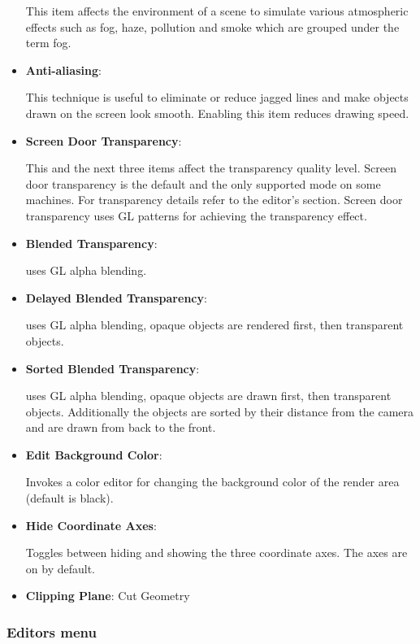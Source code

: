 \begin{itemize}
This item affects the environment of a scene to simulate various atmospheric
effects such as fog, haze, pollution and smoke which are grouped under the term fog.

\item {\bf Anti-aliasing}:

 This technique is useful to eliminate or reduce jagged lines and make objects
 drawn on the screen look smooth. Enabling this item reduces drawing speed.

\item {\bf Screen Door Transparency}:

This and the next three items affect the transparency quality level. Screen
door transparency is the default and the only supported mode on some machines.
For transparency details refer to the editor's section. Screen door
transparency uses GL patterns for achieving the transparency effect.

\item {\bf Blended Transparency}:

 uses GL alpha blending.

\item {\bf Delayed Blended Transparency}:

 uses GL alpha blending, opaque objects are rendered first, then transparent objects.

\item {\bf Sorted Blended Transparency}:

uses GL alpha blending, opaque objects are drawn first, then transparent objects.
Additionally the objects are sorted by their distance from the camera and are
drawn from back to the front.



\item {\bf Edit Background Color}:

Invokes a color editor for changing the background color of the render area (default is black).

\item {\bf Hide Coordinate Axes}:

Toggles between hiding and showing the three coordinate axes. The axes are on by default.

\item {\bf Clipping Plane}: Cut Geometry

\end{itemize}
\clearpage

\subsubsection{Editors menu}

